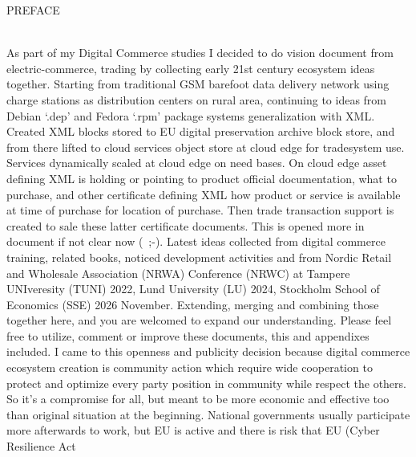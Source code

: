 %
%
%
PREFACE\label{preface}
\\
As part of my Digital Commerce\allowbreak\cite{DigitaalinenKauppa} studies I
decided to do vision document from electric-commerce, trading by collecting
early 21st century ecosystem ideas together. Starting from traditional GSM
barefoot data delivery network using charge stations as distribution centers
on rural area, continuing to ideas from Debian `.dep' and Fedora `.rpm'
package systems generalization\allowbreak\cite{SPDX} with XML. Created XML
blocks stored to EU digital preservation archive block store, and from there
lifted to cloud services object store at cloud edge for tradesystem use.
Services dynamically scaled at cloud edge on need bases. On cloud edge asset
defining XML is holding or pointing to product official documentation, what to
purchase, and other certificate defining XML how product or service is
available at time of purchase for location of purchase. Then trade transaction
support is created to sale these latter certificate documents. This is opened
more in document if not clear now (~;-). Latest ideas collected from digital
commerce training, related books, noticed development activities and from
Nordic Retail and Wholesale Association (NRWA) Conference (NRWC) at Tampere
UNIveresity (TUNI) 2022, Lund University (LU) 2024, Stockholm School of
Economics (SSE) 2026 November.
Extending, merging and combining those together here, and you are welcomed to
expand our understanding. Please feel free to utilize, comment or improve
these documents, this and appendixes included. I came to this openness and
publicity decision because digital commerce ecosystem creation is community
action which require wide cooperation to protect and optimize every party
position in community while respect the others. So it's a compromise for all,
but meant to be more economic and effective too than original situation at the
beginning. National governments usually participate more afterwards to work,
but EU is active and there is risk that EU (Cyber Resilience Act
